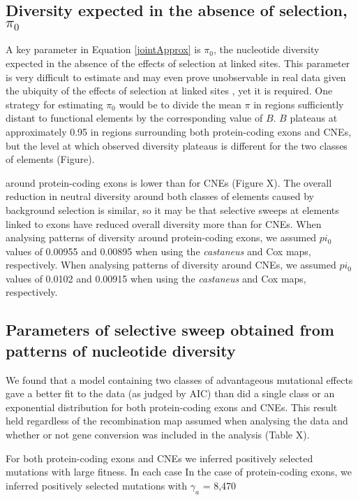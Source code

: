 \documentclass[11pt]{article}
\begin{document}
	\subsection*{Diversity expected in the absence of selection, $\pi_0$}

	A key parameter in Equation \ref{jointApprox} is $\pi_0$, the nucleotide diversity expected in the absence of the effects of selection at linked sites. This parameter is very difficult to estimate and may even prove unobservable in real data given the ubiquity of the effects of selection at linked sites \citep{RN357}, yet it is required. One strategy for estimating $\pi_0$ would be to divide the mean $\pi$ in regions sufficiently distant to functional elements by the corresponding value of $B$. $B$ plateaus at approximately 0.95 in regions surrounding both protein-coding exons and CNEs, but the level at which observed diversity plateaus is different for the two classes of elements (Figure).
	
	around protein-coding exons is lower than for CNEs (Figure X). The overall reduction in neutral diversity around both classes of elements caused by background selection is similar, so it may be that selective sweeps at elements linked to exons have reduced overall diversity more than for CNEs. When analysing patterns of diversity around protein-coding exons, we assumed $pi_0$ values of 0.00955 and 0.00895 when using the \textit{castaneus} and Cox maps, respectively. When analysing patterns of diversity around CNEs, we assumed $pi_0$ values of 0.0102 and 0.00915 when using the \textit{castaneus} and Cox maps, respectively. 
	
\subsection*{Parameters of selective sweep obtained from patterns of nucleotide diversity}

	We found that a model containing two classes of advantageous mutational effects gave a better fit to the data (as judged by AIC) than did a single class or an exponential distribution for both protein-coding exons and CNEs. This result held regardless of the recombination map assumed when analysing the data and whether or not gene conversion was included in the analysis (Table X). 
	
	For both protein-coding exons and CNEs we inferred positively selected mutations with large fitness. In each case In the case of protein-coding exons, we inferred positively selected mutations with $\gamma_a$ = 8,470 
\end{document}
